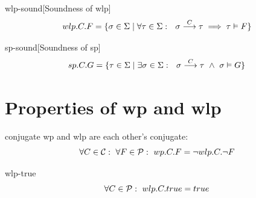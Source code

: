 \begin{theorem}{wlp-sound}[Soundness of wlp]~{\normalfont\cite{dijkstra90}}
\ \vspace{-1.5mm}
\[
wlp.C.F = \{ \sigma\in\S \mid
\forall \tau\in\S:\ \ \sigma\goto{C}\tau\implies  \tau\vDash F
 \}
\]
\end{theorem}

\begin{theorem}{sp-sound}[Soundness of sp]~{\normalfont\cite{vries11,zhang22}}
\ \vspace{-1.5mm}
\[
sp.C.G = \{ \tau\in\S \mid \exists \sigma\in\S:\ \ \sigma\goto{C}\tau\ \wedge\ \sigma\vDash G\}
\]
\label{thm:sp}
\end{theorem}


\section{Properties of wp and wlp}
\begin{theorem}{conjugate}%
  wp and wlp are each other's conjugate: 
  \[\forall C\in\C:\ \forall F\in\P:\ wp.C.F = \neg wlp.C.\neg F\]
\end{theorem}
\begin{theorem}{wlp-true}
  \[\forall C\in\P:\ wlp.C.true = true\]
\end{theorem}




